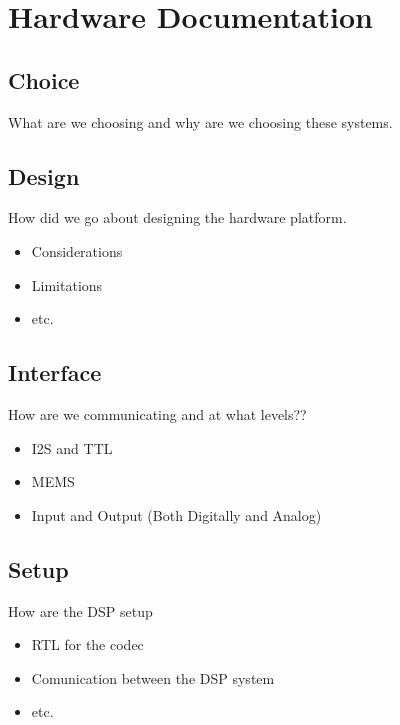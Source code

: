 \section{Hardware Documentation}

\subsection{Choice}

What are we choosing and why are we choosing these systems.


\subsection{Design}

How did we go about designing the hardware platform.

\begin{itemize}
	\item Considerations
	\item Limitations
	\item etc.
\end{itemize}


\subsection{Interface}

How are we communicating and at what levels??

\begin{itemize}
	\item I2S and TTL
	\item MEMS
	\item Input and Output (Both Digitally and Analog)
\end{itemize}



\subsection*{Setup}

How are the DSP setup

\begin{itemize}
	\item RTL for the codec
	\item Comunication between the DSP system
	\item etc.
\end{itemize}



